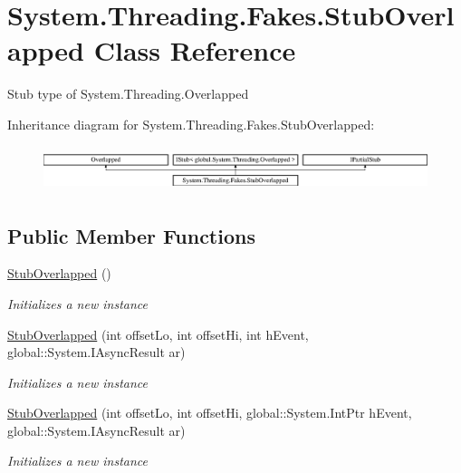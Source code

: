 \hypertarget{class_system_1_1_threading_1_1_fakes_1_1_stub_overlapped}{\section{System.\-Threading.\-Fakes.\-Stub\-Overlapped Class Reference}
\label{class_system_1_1_threading_1_1_fakes_1_1_stub_overlapped}
}


Stub type of System.\-Threading.\-Overlapped 


Inheritance diagram for System.\-Threading.\-Fakes.\-Stub\-Overlapped\-:\begin{figure}[H]
\begin{center}
\leavevmode
\includegraphics[height=1.323877cm]{class_system_1_1_threading_1_1_fakes_1_1_stub_overlapped}
\end{center}
\end{figure}
\subsection*{Public Member Functions}
\begin{DoxyCompactItemize}
\item 
\hyperlink{class_system_1_1_threading_1_1_fakes_1_1_stub_overlapped_ad81dcf5f325b62f94e777a4a00542a94}{Stub\-Overlapped} ()
\begin{DoxyCompactList}\small\item\em Initializes a new instance\end{DoxyCompactList}\item 
\hyperlink{class_system_1_1_threading_1_1_fakes_1_1_stub_overlapped_a7ebd54773973305cc4c06925fd89adeb}{Stub\-Overlapped} (int offset\-Lo, int offset\-Hi, int h\-Event, global\-::\-System.\-I\-Async\-Result ar)
\begin{DoxyCompactList}\small\item\em Initializes a new instance\end{DoxyCompactList}\item 
\hyperlink{class_system_1_1_threading_1_1_fakes_1_1_stub_overlapped_a82bf1751a96b04957a24de51d8122706}{Stub\-Overlapped} (int offset\-Lo, int offset\-Hi, global\-::\-System.\-Int\-Ptr h\-Event, global\-::\-System.\-I\-Async\-Result ar)
\begin{DoxyCompactList}\small\item\em Initializes a new instance\end{DoxyCompactList}\end{DoxyCompactItemize}
